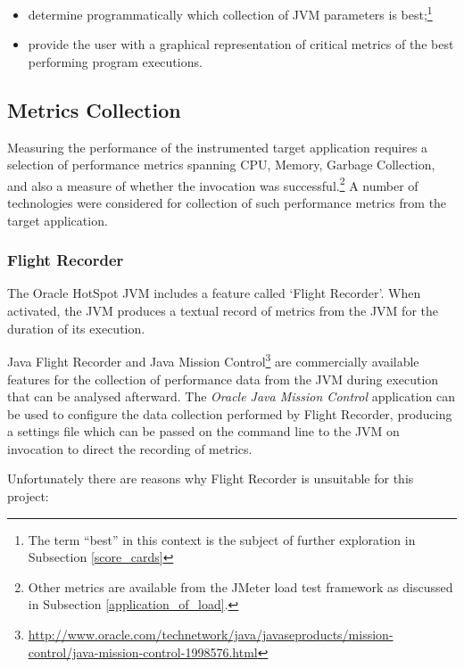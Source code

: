 \documentclass[]{final_report}
\begin{document}
\begin{itemize}
\item determine programmatically which collection of JVM parameters is best;\footnote{The term ``best'' in this context is the subject of further exploration in Subsection \ref{score_cards}}
\item provide the user with a graphical representation of critical metrics of the best performing program executions.
\end{itemize}

\subsection{Metrics Collection}

Measuring the performance of the instrumented target application requires a selection of performance metrics spanning CPU, Memory, Garbage Collection, and also a measure of whether the invocation was successful.\footnote{Other metrics are available from the JMeter load test framework as discussed in Subsection \ref{application_of_load}.} A number of technologies were considered for collection of such performance metrics from the target application.

\subsubsection{Flight Recorder} 

The Oracle HotSpot JVM includes a feature called ‘Flight Recorder’. When activated, the JVM produces a textual record of metrics from the JVM for the duration of its execution.

Java Flight Recorder and Java Mission Control\footnote{\url{http://www.oracle.com/technetwork/java/javaseproducts/mission-control/java-mission-control-1998576.html}} are commercially available features for the collection of performance data from the JVM during execution that can be analysed afterward. The \textit{Oracle Java Mission Control} application can be used to configure the data collection performed by Flight Recorder, producing a settings file which can be passed on the command line to the JVM on invocation to direct the recording of metrics.

Unfortunately there are reasons why Flight Recorder is unsuitable for this project:
\end{document}
